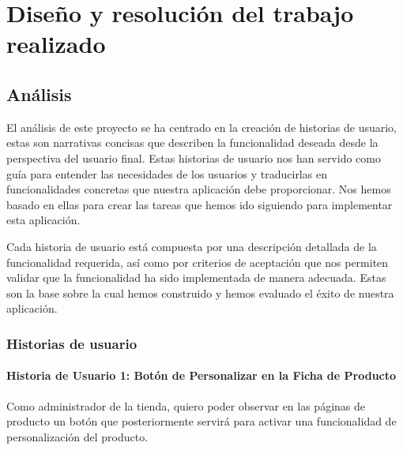 \documentclass[12pt]{article}
\newcommand{\subsubsubsection}[1]{\paragraph{#1}}
\begin{document}
\newpage
\section{Diseño y resolución del trabajo realizado}

\subsection{Análisis}
El análisis de este proyecto se ha centrado en la creación de historias de usuario, estas son narrativas 
concisas que describen la funcionalidad deseada desde la perspectiva del usuario final. 
Estas historias de usuario nos han servido como guía para entender las necesidades de los usuarios y traducirlas en 
funcionalidades concretas que nuestra aplicación debe proporcionar. Nos hemos basado en ellas para crear
las tareas que hemos ido siguiendo para implementar esta aplicación.

Cada historia de usuario está compuesta por una descripción detallada de la funcionalidad requerida, así como por criterios de aceptación que 
nos permiten validar que la funcionalidad ha sido implementada de manera adecuada. Estas son la base sobre la cual hemos construido y hemos evaluado el éxito de nuestra aplicación.

\subsubsection{Historias de usuario}

\subsubsubsection{Historia de Usuario 1: Botón de Personalizar en la Ficha de Producto}\label{sec:historia1}

Como administrador de la tienda, quiero poder observar en las páginas de producto un botón que posteriormente servirá para activar una funcionalidad de personalización del producto.
\end{document}
